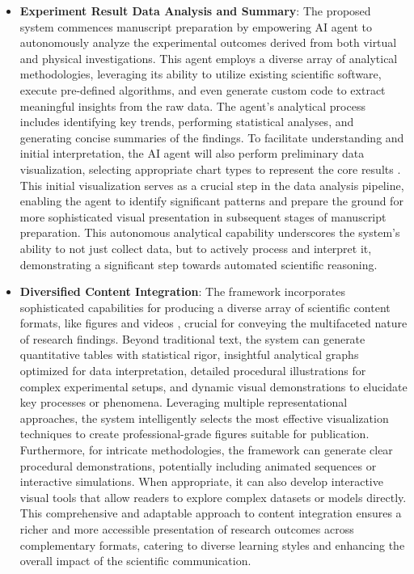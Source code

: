 \begin{itemize}

    \item \textbf{Experiment Result Data Analysis and Summary}: The proposed system commences manuscript preparation by empowering AI agent to autonomously analyze the experimental outcomes derived from both virtual and physical investigations. This agent employs a diverse array of analytical methodologies, leveraging its ability to utilize existing scientific software, execute pre-defined algorithms, and even generate custom code to extract meaningful insights from the raw data. The agent's analytical process includes identifying key trends, performing statistical analyses, and generating concise summaries of the findings. To facilitate understanding and initial interpretation, the AI agent will also perform preliminary data visualization, selecting appropriate chart types to represent the core results \cite{yang2024matplotagent, vazquez2024llms}. This initial visualization serves as a crucial step in the data analysis pipeline, enabling the agent to identify significant patterns and prepare the ground for more sophisticated visual presentation in subsequent stages of manuscript preparation. This autonomous analytical capability underscores the system's ability to not just collect data, but to actively process and interpret it, demonstrating a significant step towards automated scientific reasoning.


    \item \textbf{Diversified Content Integration}: The framework incorporates sophisticated capabilities for producing a diverse array of scientific content formats, like figures and videos \cite{xing2024empowering, zhou2024survey}, crucial for conveying the multifaceted nature of research findings. Beyond traditional text, the system can generate quantitative tables with statistical rigor, insightful analytical graphs optimized for data interpretation, detailed procedural illustrations for complex experimental setups, and dynamic visual demonstrations to elucidate key processes or phenomena. Leveraging multiple representational approaches, the system intelligently selects the most effective visualization techniques to create professional-grade figures suitable for publication. Furthermore, for intricate methodologies, the framework can generate clear procedural demonstrations, potentially including animated sequences or interactive simulations. When appropriate, it can also develop interactive visual tools that allow readers to explore complex datasets or models directly. This comprehensive and adaptable approach to content integration ensures a richer and more accessible presentation of research outcomes across complementary formats, catering to diverse learning styles and enhancing the overall impact of the scientific communication.


\end{itemize}
